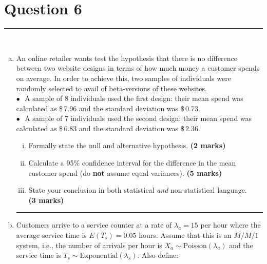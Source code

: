 \documentclass[12pt]{article}
\begin{document}
\newpage







\section*{Question 6 }
\noindent\rule{\linewidth}{1pt}
\quad\\[-0.5cm]
\begin{enumerate}[a)]
\item An online retailer wants test the hypothesis that there is no difference between two website designs in terms of how much money a customer spends on average. In order to achieve this, two samples of individuals were randomly selected to avail of beta-versions of these websites.\\[0.4cm]
    $\bullet$\,\, A sample of 8 individuals used the first design: their mean spend was calculated as \$\,7.96 and the standard deviation was \$\,0.73.
    \\[0.4cm]
    $\bullet$\,\,  A sample of 7 individuals used the second design: their mean spend was calculated as \$\,6.83 and the standard deviation was \$\,2.36.\\[-0.2cm]
\begin{enumerate}[i)]\itemsep0.3cm
\item Formally state the null and alternative hypothesis. \hfill{\scriptsize \bf (2 marks)}
\item Calculate a 95\% confidence interval for the difference in the mean customer spend (do {\bf not} assume equal variances). \hfill{\scriptsize \bf (5 marks)}
\item State your conclusion in both statistical \emph{and} non-statistical language.\\\phantom{a} \hfill{\scriptsize \bf (3 marks)}
\end{enumerate}
\begin{center}\noindent\rule{0.4\linewidth}{0.5pt}\end{center}
\item Customers arrive to a service counter at a rate of $\lambda_a=15$ per hour where the average service time is $E(T_s) = 0.05$ hours. Assume that this is an $M/M/1$ system, i.e., the number of arrivals per hour is $X_a \sim \text{Poisson}(\lambda_a)$ and the service time is $T_s \sim \text{Exponential}(\lambda_s)$. Also define:\\[0.2cm]

\end{enumerate}
\end{document}
